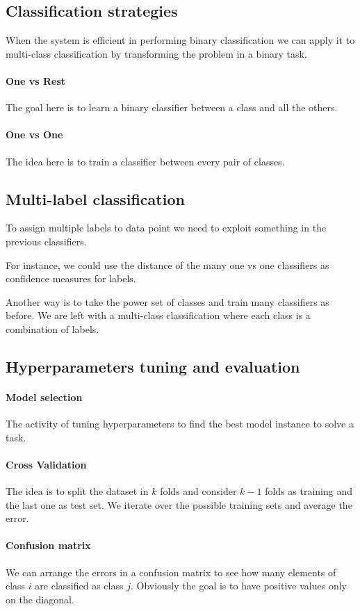 \subsection{Classification strategies}
When the system is efficient in performing binary classification
we can apply it to multi-class classification by transforming the 
problem in a binary task.

\paragraph{One vs Rest}
The goal here is to learn a binary classifier between a class and all 
the others.

\paragraph{One vs One}
The idea here is to train a classifier between every pair of classes.

\subsection{Multi-label classification}
To assign multiple labels to data point we need to exploit 
something in the previous classifiers. 

For instance, we could use the distance of the many one vs one classifiers 
as confidence measures for labels. 

Another way is to take the power set of classes and train many classifiers 
as before. We are left with a multi-class classification 
where each class is a combination of labels.

\subsection{Hyperparameters tuning  and evaluation}

\paragraph{Model selection}
The activity of tuning hyperparameters to find the 
best model instance to solve a task.

\paragraph{Cross Validation}
The idea is to split the dataset in $k$ folds and consider 
$k-1$ folds as training and the last one as test set.
We iterate over the possible training sets and average the error.

\paragraph{Confusion matrix}
We can arrange the errors in a confusion matrix to see 
how many elements of class $i$ are classified as class $j$. 
Obviously the goal is to have positive values only on the 
diagonal.
